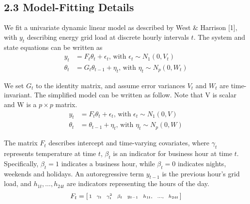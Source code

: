\documentclass{article}
\begin{document}
\subsection{2.3 Model-Fitting Details}
We fit a univariate dynamic linear model as described by West \& Harrison [1], with $y_t$ describing energy grid load at discrete hourly intervals $t$.  The system and state equations can be written as
\begin{align*}
	y_t &= F_t \theta_t + \epsilon_t \text{, with } \epsilon_t \sim N_1(0,V_t) \\
	\theta_t &= G_t \theta_{t-1} + \eta_t \text{, with } \eta_t \sim N_p(0,W_t)
\end{align*}

We set $G_t$ to the identity matrix, and assume error variances $V_t$ and $W_t$ are time-invariant.  The simplified model can be written as follow.  Note that V is scalar and W is a $p \times p$ matrix.
\begin{align*}
	y_t &= F_t \theta_t + \epsilon_t \text{, with } \epsilon_t \sim N_1(0,V) \\
	\theta_t &= \theta_{t-1} + \eta_t \text{, with } \eta_t \sim N_p(0,W)
\end{align*}

The matrix $F_t$ describes intercept and time-varying covariates, where $\gamma_t$ represents temperature at time $t$, $\beta_t$ is an indicator for business hour at time $t$.  Specifically, $\beta_t=1$ indicates a business hour, while $\beta_t=0$ indicates nights, weekends and holidays. An autoregressive term $y_{t-1}$ is the previous hour's grid load, and $h_{1t},\hdots,h_{24t}$ are indicators representing the hours of the day.
\begin{align*}
	F_t = \left[\begin{smallmatrix} 1 \hspace{.25cm}
	\gamma_t 	\hspace{.25cm}	
	\gamma_t^2	\hspace{.25cm}
	\beta_t  	\hspace{.25cm}
	y_{t-1} 	\hspace{.25cm}
	h_{1t}, 	\hspace{.25cm}
	\hdots, 	\hspace{.25cm}
	h_{24t}\end{smallmatrix}\right]
\end{align*}
\end{document}
